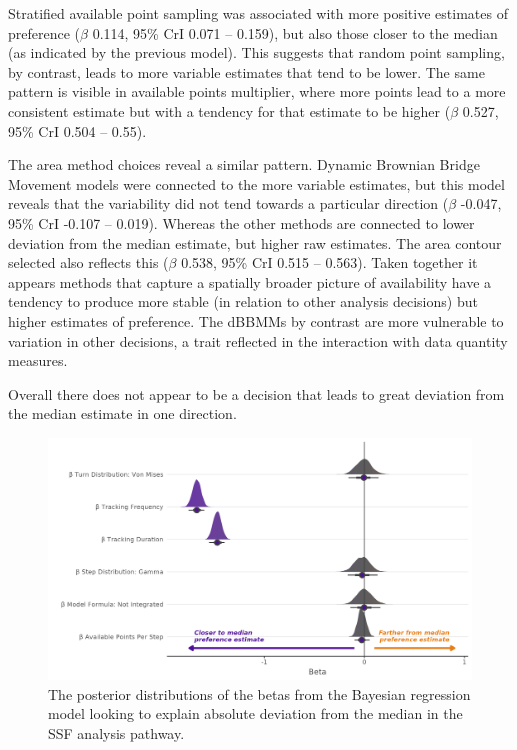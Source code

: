 \documentclass[10pt,a4paper]{article}
\begin{document}
Stratified available point sampling was associated with more positive estimates of preference (\(\beta\) 0.114, 95\% CrI 0.071 -- 0.159), but also those closer to the median (as indicated by the previous model).
This suggests that random point sampling, by contrast, leads to more variable estimates that tend to be lower.
The same pattern is visible in available points multiplier, where more points lead to a more consistent estimate but with a tendency for that estimate to be higher (\(\beta\) 0.527, 95\% CrI 0.504 -- 0.55).

The area method choices reveal a similar pattern.
Dynamic Brownian Bridge Movement models were connected to the more variable estimates, but this model reveals that the variability did not tend towards a particular direction (\(\beta\) -0.047, 95\% CrI -0.107 -- 0.019).
Whereas the other methods are connected to lower deviation from the median estimate, but higher raw estimates.
The area contour selected also reflects this (\(\beta\) 0.538, 95\% CrI 0.515 -- 0.563).
Taken together it appears methods that capture a spatially broader picture of availability have a tendency to produce more stable (in relation to other analysis decisions) but higher estimates of preference.
The dBBMMs by contrast are more vulnerable to variation in other decisions, a trait reflected in the interaction with data quantity measures.

Overall there does not appear to be a decision that leads to great deviation from the median estimate in one direction.

\begin{figure}
\includegraphics[width=1\linewidth]{../figures/ssf_dEstSSF_effectsPlot} \caption{The posterior distributions of the betas from the Bayesian regression model looking to explain absolute deviation from the median in the SSF analysis pathway.}\label{fig:dEstBetasSSF}
\end{figure}
\end{document}

